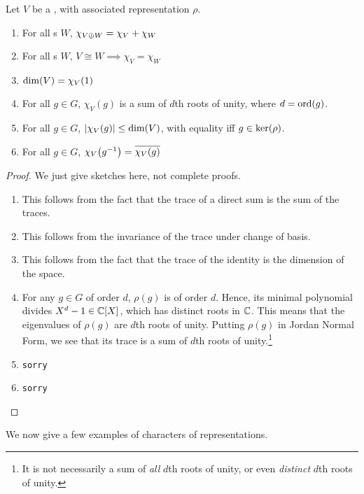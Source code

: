 \begin{boxproposition}\label{Ch2:Prop:Bhv_Char}
    Let $V$ be a \CGM, with associated representation $\rho$.
    \begin{enumerate}[label = \normalfont \arabic*., noitemsep]
        \item For all \CGM s $W$, $\chi_{V \oplus W} = \chi_V + \chi_W$
        \item  For all \CGM s $W$, $V \cong W \implies \chi_V = \chi_W$
        \item $\dim\!\left( V \right) = \chi_V(1)$
        \item For all $g \in G$, $\chi_V(g)$ is a sum of $d$th roots of unity, where $d = \operatorname{ord}\!\left( g \right)$.
        \item For all $g \in G$, $\left\lvert \chi_V(g) \right\rvert \leq \dim\!\left( V \right)$, with equality iff $g \in \operatorname{ker}\!\left( \rho \right)$.
        \item For all $g \in G$, $\chi_V\!\left( g^{-1} \right) = \overline{\chi_V(g)}$
    \end{enumerate}
\end{boxproposition}
\begin{proof}
    We just give sketches here, not complete proofs.
    \begin{enumerate}[noitemsep]
        \item This follows from the fact that the trace of a direct sum is the sum of the traces.
        \item This follows from the invariance of the trace under change of basis.
        \item This follows from the fact that the trace of the identity is the dimension of the space.
        \item For any $g \in G$ of order $d$, $\rho(g)$ is of order $d$. Hence, its minimal polynomial divides $X^d - 1 \in \mathbb{C}[X]$, which has distinct roots in $\mathbb{C}$. This means that the eigenvalues of $\rho(g)$ are $d$th roots of unity. Putting $\rho(g)$ in Jordan Normal Form, we see that its trace is a sum of $d$th roots of unity.\footnote{It is not necessarily a sum of \textit{all} $d$th roots of unity, or even \textit{distinct} $d$th roots of unity.}
        \item \verb|sorry|
        \item \verb|sorry|
    \end{enumerate}
\end{proof}

We now give a few examples of characters of representations.

